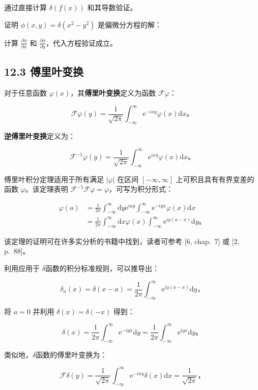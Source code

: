 通过直接计算 \(\delta(f(x))\) 和其导数验证。

证明 \(\phi(x, y) = \delta(x^2 - y^2)\) 是偏微分方程的解：

计算 \(\frac{\partial \phi}{\partial x}\) 和
\(\frac{\partial \phi}{\partial y}\)，代入方程验证成立。

\subsection{12.3 傅里叶变换}\label{ux5085ux91ccux53f6ux53d8ux6362}

对于任意函数 \(\varphi(x)\)，其\textbf{傅里叶变换}定义为函数
\(\mathcal{F} \varphi\)：

\[
\mathcal{F} \varphi(y)=\frac{1}{\sqrt{2 \pi}} \int_{-\infty}^\infty \mathrm{e}^{-i x y} \varphi(x) \mathrm{d}x。
\]

\textbf{逆傅里叶变换}定义为：

\[
\mathcal{F}^{-1} \varphi(y)=\frac{1}{\sqrt{2 \pi}} \int_{-\infty}^\infty \mathrm{e}^{i x y} \varphi(x) \mathrm{d}x。
\]

傅里叶积分定理适用于所有满足 \(|\varphi|\) 在区间 \([-\infty, \infty]\)
上可积且具有有界变差的函数 \(\varphi\)。该定理表明
\(\mathcal{F}^{-1} \mathcal{F} \varphi=\varphi\)，可写为积分形式：

\[
\begin{aligned}
\varphi(a) & =\frac{1}{2 \pi} \int_{-\infty}^\infty \mathrm{d}y \mathrm{e}^{i a y} \int_{-\infty}^\infty \mathrm{e}^{-i y x} \varphi(x) \mathrm{d}x \\
& =\frac{1}{2 \pi} \int_{-\infty}^\infty \mathrm{d}x \varphi(x) \int_{-\infty}^\infty \mathrm{e}^{i y(a-x)} \mathrm{d}y。
\end{aligned}
\]

该定理的证明可在许多实分析的书籍中找到，读者可参考 {[}6, chap.~7{]} 或
{[}2, p.~88{]}。

利用应用于 $\delta$函数的积分标准规则，可以推导出：

\[
\delta_a(x) = \delta(x-a) = \frac{1}{2 \pi} \int_{-\infty}^\infty \mathrm{e}^{i y(a-x)} \mathrm{d}y，
\]

将 \(a=0\) 并利用 \(\delta(x)=\delta(-x)\) 得到：

\[
\delta(x)=\frac{1}{2 \pi} \int_{-\infty}^\infty \mathrm{e}^{-i y x} \mathrm{d}y = \frac{1}{2 \pi} \int_{-\infty}^\infty \mathrm{e}^{i y x} \mathrm{d}y。
\]

类似地，$\delta$函数的傅里叶变换为：

\[
\mathcal{F} \delta(y)=\frac{1}{\sqrt{2 \pi}} \int_{-\infty}^\infty \mathrm{e}^{-i x y} \delta(x) \mathrm{d}x = \frac{1}{\sqrt{2 \pi}}，
\]

